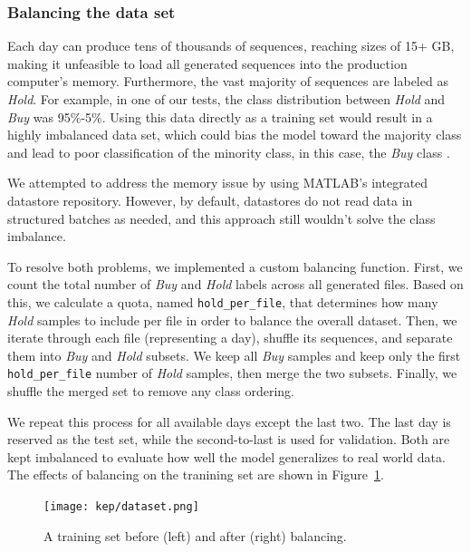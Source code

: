 \documentclass[a4paper,oneside,onecolumn,12pt]{book}
\begin{document}
		\subsubsection{Balancing the data set}
		Each day can produce tens of thousands of sequences, reaching sizes of 15+ GB, making it unfeasible to load all generated sequences into the production computer's memory. Furthermore, the vast majority of sequences are labeled as \textit{Hold}. For example, in one of our tests, the class distribution between \textit{Hold} and \textit{Buy} was 95\%-5\%. Using this data directly as a training set would result in a highly imbalanced data set, which could bias the model toward the majority class and lead to poor classification of the minority class, in this case, the \textit{Buy} class \cite{DID}.

		We attempted to address the memory issue by using MATLAB's integrated datastore repository. However, by default, datastores do not read data in structured batches as needed, and this approach still wouldn't solve the class imbalance.

		To resolve both problems, we implemented a custom balancing function. First, we count the total number of \textit{Buy} and \textit{Hold} labels across all generated files. Based on this, we calculate a quota, named \texttt{hold\_per\_file}, that determines how many \textit{Hold} samples to include per file in order to balance the overall dataset. Then, we iterate through each file (representing a day), shuffle its sequences, and separate them into \textit{Buy} and \textit{Hold} subsets. We keep all \textit{Buy} samples and keep only the first \texttt{hold\_per\_file} number of \textit{Hold} samples, then merge the two subsets. Finally, we shuffle the merged set to remove any class ordering.

		We repeat this process for all available days except the last two. The last day is reserved as the test set, while the second-to-last is used for validation. Both are kept imbalanced to evaluate how well the model generalizes to real world data. The effects of balancing on the tranining set are shown in Figure~\ref{fig:un_balanced_dataset}.

		\begin{figure}[H]
		\begin{center}
			\texttt{[image: kep/dataset.png]}
			\caption{A training set before (left) and after (right) balancing.}
			\label{fig:un_balanced_dataset}
		\end{center}
		\end{figure}
\end{document}
